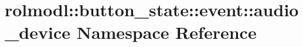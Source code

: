 \hypertarget{namespacerolmodl_1_1button__state_1_1event_1_1audio__device}{}\section{rolmodl\+::button\+\_\+state\+::event\+::audio\+\_\+device Namespace Reference}
\label{namespacerolmodl_1_1button__state_1_1event_1_1audio__device}

